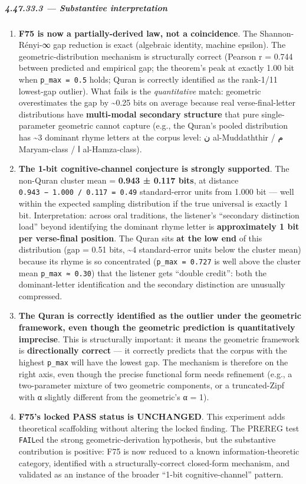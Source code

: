 \documentclass[
]{article}
\begin{document}
\subparagraph{4.47.33.3 --- Substantive
interpretation}\label{substantive-interpretation}

\begin{enumerate}
\def\labelenumi{\arabic{enumi}.}
\item
  \textbf{F75 is now a partially-derived law, not a coincidence}. The
  Shannon-Rényi-∞ gap reduction is exact (algebraic identity, machine
  epsilon). The geometric-distribution mechanism is structurally correct
  (Pearson r = 0.744 between predicted and empirical gap; the theorem's
  peak at exactly 1.00 bit when \texttt{p\_max\ =\ 0.5} holds; Quran is
  correctly identified as the rank-1/11 lowest-gap outlier). What fails
  is the \emph{quantitative} match: geometric overestimates the gap by
  \textasciitilde0.25 bits on average because real verse-final-letter
  distributions have \textbf{multi-modal secondary structure} that pure
  single-parameter geometric cannot capture (e.g., the Quran's pooled
  distribution has \textasciitilde3 dominant rhyme letters at the corpus
  level: ن al-Muddaththir / م Maryam-class / ا al-Hamza-class).
\item
  \textbf{The 1-bit cognitive-channel conjecture is strongly supported}.
  The non-Quran cluster mean = \textbf{0.943 ± 0.117 bits}, at distance
  \texttt{\textbar{}0.943\ −\ 1.000\textbar{}\ /\ 0.117\ =\ 0.49}
  standard-error units from 1.000 bit --- well within the expected
  sampling distribution if the true universal is exactly 1 bit.
  Interpretation: across oral traditions, the listener's ``secondary
  distinction load'' beyond identifying the dominant rhyme letter is
  \textbf{approximately 1 bit per verse-final position}. The Quran sits
  \textbf{at the low end} of this distribution (gap = 0.51 bits,
  \textasciitilde4 standard-error units below the cluster mean) because
  its rhyme is so concentrated (\texttt{p\_max\ =\ 0.727} is well above
  the cluster mean \texttt{p\_max\ ≈\ 0.30}) that the listener gets
  ``double credit'': both the dominant-letter identification and the
  secondary distinction are unusually compressed.
\item
  \textbf{The Quran is correctly identified as the outlier under the
  geometric framework, even though the geometric prediction is
  quantitatively imprecise}. This is structurally important: it means
  the geometric framework is \textbf{directionally correct} --- it
  correctly predicts that the corpus with the highest \texttt{p\_max}
  will have the lowest gap. The mechanism is therefore on the right
  axis, even though the precise functional form needs refinement (e.g.,
  a two-parameter mixture of two geometric components, or a
  truncated-Zipf with α slightly different from the geometric's α = 1).
\item
  \textbf{F75's locked PASS status is UNCHANGED}. This experiment adds
  theoretical scaffolding without altering the locked finding. The
  PREREG test \texttt{FAIL}ed the strong geometric-derivation
  hypothesis, but the substantive contribution is positive: F75 is now
  reduced to a known information-theoretic category, identified with a
  structurally-correct closed-form mechanism, and validated as an
  instance of the broader ``1-bit cognitive-channel'' pattern.
\end{enumerate}
\end{document}
